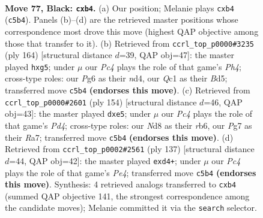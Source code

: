 \documentclass[11pt]{article}
\begin{document}
\clearpage

\begin{figure}[p]\centering
\begin{subfigure}{0.46\textwidth}\centering
\resizebox{\linewidth}{!}{%
\newchessgame
\chessboard[
  setfen={3n4/2k3p1/1p4p1/p1p5/1PP5/8/K7/2q5 b - - 0 77},
  showmover=false,
  pgfstyle=straightmove, color=movearrow, markmove={c5-b4}
]}
\caption{}
\end{subfigure}\hfill
\begin{subfigure}{0.46\textwidth}\centering
\resizebox{\linewidth}{!}{%
\newchessgame
\chessboard[
  setfen={5k2/5p2/7p/3B2p1/3n3P/6P1/5PK1/8 w - - 0 83},
  showmover=false,
  pgfstyle=straightmove, color=movearrow, markmove={h4-g5}
]}
\caption{}
\end{subfigure}
\\[4pt]
\begin{subfigure}{0.46\textwidth}\centering
\resizebox{\linewidth}{!}{%
\newchessgame
\chessboard[
  setfen={8/R7/1r6/3ppp1k/3P4/4P3/4K3/8 w - - 0 78},
  showmover=false,
  pgfstyle=straightmove, color=movearrow, markmove={d4-e5}
]}
\caption{}
\end{subfigure}\hfill
\begin{subfigure}{0.46\textwidth}\centering
\resizebox{\linewidth}{!}{%
\newchessgame
\chessboard[
  setfen={8/4k3/3p3p/4p2P/3PP3/2K5/8/8 b - - 0 69},
  showmover=false,
  pgfstyle=straightmove, color=movearrow, markmove={e5-d4}
]}
\caption{}
\end{subfigure}
\caption{\textbf{Move 77, Black: \texttt{cxb4}.} (a) Our position; Melanie plays \texttt{cxb4} (\texttt{c5b4}). Panels (b)--(d) are the retrieved master positions whose correspondence most drove this move (highest QAP objective among those that transfer to it). (b) Retrieved from \texttt{ccrl\_top\_p0000\#3235} (ply 164) [structural distance $d$=39, QAP obj=47]: the master played \texttt{hxg5}; under $\mu$ our \emph{Pc4} plays the role of that game's \emph{Ph4}; cross-type roles: our \emph{P}g6 as their \emph{n}d4, our \emph{Q}c1 as their \emph{B}d5; transferred move \texttt{c5b4} \textbf{(endorses this move)}. (c) Retrieved from \texttt{ccrl\_top\_p0000\#2601} (ply 154) [structural distance $d$=46, QAP obj=43]: the master played \texttt{dxe5}; under $\mu$ our \emph{Pc4} plays the role of that game's \emph{Pd4}; cross-type roles: our \emph{N}d8 as their \emph{r}b6, our \emph{P}g7 as their \emph{R}a7; transferred move \texttt{c5b4} \textbf{(endorses this move)}. (d) Retrieved from \texttt{ccrl\_top\_p0002\#2561} (ply 137) [structural distance $d$=44, QAP obj=42]: the master played \texttt{exd4+}; under $\mu$ our \emph{Pc4} plays the role of that game's \emph{Pe4}; transferred move \texttt{c5b4} \textbf{(endorses this move)}. Synthesis: 4 retrieved analogs transferred to \texttt{cxb4} (summed QAP objective 141, the strongest correspondence among the candidate moves); Melanie committed it via the \texttt{search} selector.}
\label{fig:thought-m153}
\end{figure}
\end{document}
